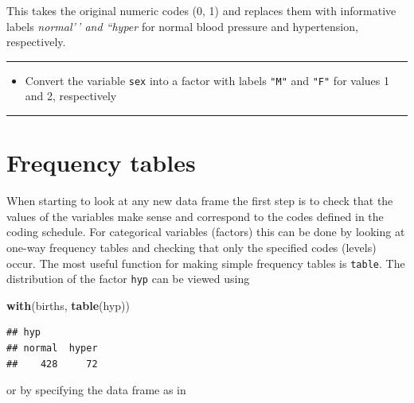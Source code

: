 \documentclass[
]{book}
\newenvironment{Shaded}{\begin{snugshade}}{\end{snugshade}}
\newcommand{\FunctionTok}[1]{\textcolor[rgb]{0.13,0.29,0.53}{\textbf{#1}}}
\newcommand{\NormalTok}[1]{#1}
\newcommand{\SpecialCharTok}[1]{\textcolor[rgb]{0.81,0.36,0.00}{\textbf{#1}}}
\providecommand{\tightlist}{%
  \setlength{\itemsep}{0pt}\setlength{\parskip}{0pt}}
\begin{document}
This takes the original numeric codes (0, 1) and replaces them with
informative labels \emph{normal'\,' and ``hyper} for normal blood pressure
and hypertension, respectively.

\begin{center}\rule{0.5\linewidth}{0.5pt}\end{center}

\begin{itemize}
\tightlist
\item
  Convert the variable \texttt{sex} into a factor
  with labels \texttt{"M"} and \texttt{"F"} for values 1 and 2, respectively
\end{itemize}

\begin{center}\rule{0.5\linewidth}{0.5pt}\end{center}

\section{Frequency tables}\label{frequency-tables}

When starting to look at any new data frame the first step is to check
that the values of the variables make sense and correspond to the
codes defined in the coding schedule. For categorical variables
(factors) this can be done by looking at one-way frequency tables and
checking that only the specified codes (levels) occur. The most
useful function for making simple frequency tables is \texttt{table}.
The distribution of the factor \texttt{hyp} can be viewed using

\begin{Shaded}
\begin{Highlighting}[]
\FunctionTok{with}\NormalTok{(births, }\FunctionTok{table}\NormalTok{(hyp))}
\end{Highlighting}
\end{Shaded}

\begin{verbatim}
## hyp
## normal  hyper 
##    428     72
\end{verbatim}

or by specifying the data frame as in

\begin{Shaded}
\end{Shaded}
\end{document}

